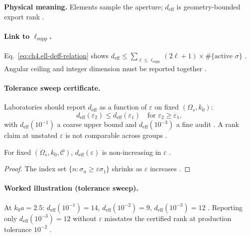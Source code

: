 \textbf{Physical meaning.} Elements sample the aperture; \(d_{\mathrm{eff}}\) is geometry-bounded export rank \cite{stratton1941}.

\paragraph{Link to \(\ell_{\mathrm{supp}}\).}
Eq.~\eqref{eq:ch4.ell-deff-relation} shows \(d_{\mathrm{eff}}\le\sum_{\ell\le\ell_{\mathrm{supp}}}(2\ell+1)\times\#\{\text{active }\sigma\}\)
\cite{harrington2001}. Angular ceiling and integer dimension must be reported together \cite{hansen1988,stratton1941}.

\paragraph{Tolerance sweep certificate.}
Laboratories should report \(d_{\mathrm{eff}}\) as a function of \(\varepsilon\) on fixed \((\Omega_{s},k_{0})\):
\begin{equation}
\label{eq:ch4.deff-epsilon-sweep}
d_{\mathrm{eff}}(\varepsilon_{2})\le d_{\mathrm{eff}}(\varepsilon_{1})\quad\text{for }\varepsilon_{2}\ge\varepsilon_{1},
\end{equation}
with \(d_{\mathrm{eff}}(10^{-1})\) a coarse upper bound and \(d_{\mathrm{eff}}(10^{-3})\) a fine audit \cite{hansen1988,harrington2001,devaney2004}.
A rank claim at unstated \(\varepsilon\) is not comparable across groups \cite{stratton1941}.

\begin{theorem}
\label{thm:ch4.deff-monotone-epsilon}
For fixed \((\Omega_{s},k_{0},\mathcal{C})\), \(d_{\mathrm{eff}}(\varepsilon)\) is non-increasing in \(\varepsilon\)
\cite{harrington2001,hansen1988,stratton1941}.
\end{theorem}
\begin{proof}
The index set \(\{n:\sigma_{n}\ge\varepsilon\sigma_{1}\}\) shrinks as \(\varepsilon\) increases \cite{harrington2001}.
\end{proof}

\paragraph{Worked illustration (tolerance sweep).}
At \(k_{0}a=2.5\): \(d_{\mathrm{eff}}(10^{-1})=14\), \(d_{\mathrm{eff}}(10^{-2})=9\), \(d_{\mathrm{eff}}(10^{-3})=12\)
\cite{hansen1988,harrington2001}. Reporting only \(d_{\mathrm{eff}}(10^{-3})=12\) without \(\varepsilon\) misstates the certified rank at
production tolerance \(10^{-2}\) \cite{devaney2004,stratton1941}.

